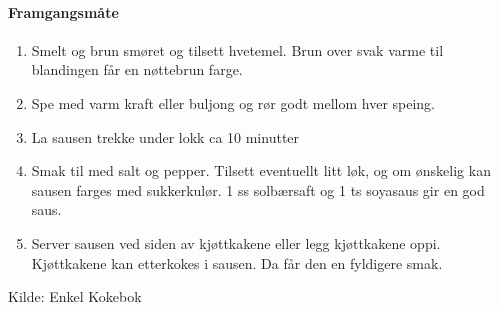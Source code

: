 \paragraph{Framgangsmåte}
\begin{enumerate}[noitemsep]
	\item Smelt og brun smøret og tilsett hvetemel. Brun over svak varme til blandingen får en nøttebrun farge.
	\item Spe med varm kraft eller buljong og rør godt mellom hver speing.
	\item La sausen trekke under lokk ca 10 minutter
	\item Smak til med salt og pepper. Tilsett eventuellt litt løk, og om ønskelig kan sausen farges med sukkerkulør. 1 ss solbærsaft og 1 ts soyasaus gir en god saus.
	\item Server sausen ved siden av kjøttkakene eller legg kjøttkakene oppi. Kjøttkakene kan etterkokes i sausen. Da får den en fyldigere smak.
\end{enumerate}

Kilde: Enkel Kokebok
